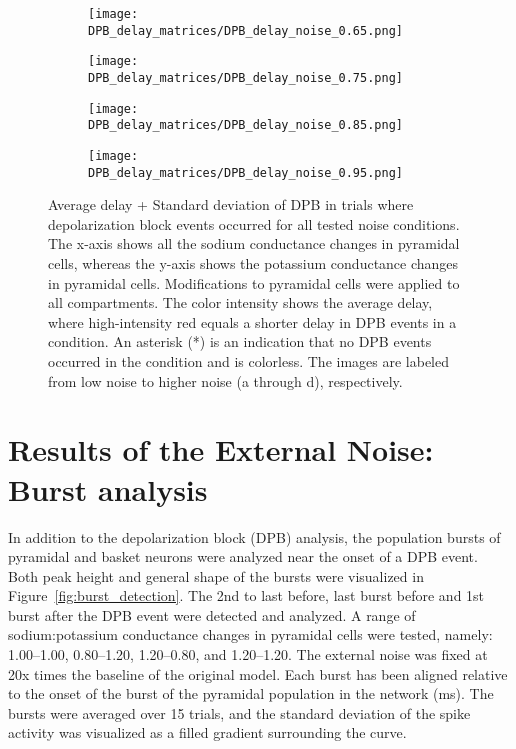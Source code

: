 \begin{figure}[htbp]
    \centering
    \begin{subfigure}{0.48\textwidth}
        \texttt{[image: DPB\_delay\_matrices/DPB\_delay\_noise\_0.65.png]}
        \caption{} %
    \end{subfigure}\hfill
    \begin{subfigure}{0.48\textwidth}
        \texttt{[image: DPB\_delay\_matrices/DPB\_delay\_noise\_0.75.png]}
        \caption{} %
    \end{subfigure}

    \bigskip %

    \begin{subfigure}{0.48\textwidth}
        \texttt{[image: DPB\_delay\_matrices/DPB\_delay\_noise\_0.85.png]}
        \caption{} %
    \end{subfigure}\hfill
    \begin{subfigure}{0.48\textwidth}
        \texttt{[image: DPB\_delay\_matrices/DPB\_delay\_noise\_0.95.png]}
        \caption{} %
    \end{subfigure}

    \caption[DPB delay matrices]{Average delay + Standard deviation of DPB in trials where depolarization block events occurred for all tested noise conditions.
        The x-axis shows all the sodium conductance changes in pyramidal cells, whereas the y-axis shows the potassium conductance changes in pyramidal cells.
        Modifications to pyramidal cells were applied to all compartments.
        The color intensity shows the average delay, where high-intensity red equals a shorter delay in DPB events in a condition.
        An asterisk (*) is an indication that no DPB events occurred in the condition and is colorless.
        The images are labeled from low noise to higher noise (a through d), respectively.}\label{fig:dpb_delay_matrices}
\end{figure}
\pagebreak

\section{Results of the External Noise: Burst analysis}
In addition to the depolarization block (DPB) analysis, the population bursts of pyramidal and basket neurons were analyzed near the onset of a DPB event.
Both peak height and general shape of the bursts were visualized in Figure~\ref{fig:burst_detection}.
The 2nd to last before, last burst before and 1st burst after the DPB event were detected and analyzed.
A range of sodium:potassium conductance changes in pyramidal cells were tested, namely: 1.00--1.00, 0.80--1.20, 1.20--0.80, and 1.20--1.20.
The external noise was fixed at 20x times the baseline of the original model.
Each burst has been aligned relative to the onset of the burst of the pyramidal population in the network (ms).
The bursts were averaged over 15 trials, and the standard deviation of the spike activity was visualized as a filled gradient surrounding the curve.

